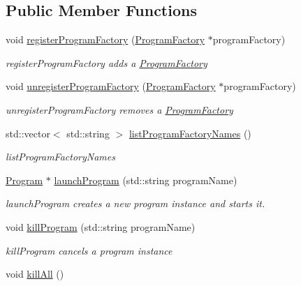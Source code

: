 \subsection*{Public Member Functions}
\begin{DoxyCompactItemize}
\item 
void \hyperlink{classdrobot_1_1program_1_1ProgramManager_a4ea28e6c3b74b746364bbc3c2d68bd31}{register\-Program\-Factory} (\hyperlink{classdrobot_1_1program_1_1ProgramFactory}{Program\-Factory} $\ast$program\-Factory)
\begin{DoxyCompactList}\small\item\em register\-Program\-Factory adds a \hyperlink{classdrobot_1_1program_1_1ProgramFactory}{Program\-Factory} \end{DoxyCompactList}\item 
void \hyperlink{classdrobot_1_1program_1_1ProgramManager_a190faf45e5e408b02e0b9858240244ea}{unregister\-Program\-Factory} (\hyperlink{classdrobot_1_1program_1_1ProgramFactory}{Program\-Factory} $\ast$program\-Factory)
\begin{DoxyCompactList}\small\item\em unregister\-Program\-Factory removes a \hyperlink{classdrobot_1_1program_1_1ProgramFactory}{Program\-Factory} \end{DoxyCompactList}\item 
std\-::vector$<$ std\-::string $>$ \hyperlink{classdrobot_1_1program_1_1ProgramManager_a8d67fbed1cdde2f1b0053809e2a35a7b}{list\-Program\-Factory\-Names} ()
\begin{DoxyCompactList}\small\item\em list\-Program\-Factory\-Names \end{DoxyCompactList}\item 
\hyperlink{classdrobot_1_1program_1_1Program}{Program} $\ast$ \hyperlink{classdrobot_1_1program_1_1ProgramManager_adf94bbb6de02d9d304e2776a9e21d40d}{launch\-Program} (std\-::string program\-Name)
\begin{DoxyCompactList}\small\item\em launch\-Program creates a new program instance and starts it. \end{DoxyCompactList}\item 
void \hyperlink{classdrobot_1_1program_1_1ProgramManager_a8ff0772daea03353f6473e041469093a}{kill\-Program} (std\-::string program\-Name)
\begin{DoxyCompactList}\small\item\em kill\-Program cancels a program instance \end{DoxyCompactList}\item 
\hypertarget{classdrobot_1_1program_1_1ProgramManager_a193a85cf0e58c44955513aab1e7253b4}{void \hyperlink{classdrobot_1_1program_1_1ProgramManager_a193a85cf0e58c44955513aab1e7253b4}{kill\-All} ()}\label{classdrobot_1_1program_1_1ProgramManager_a193a85cf0e58c44955513aab1e7253b4}


\end{DoxyCompactItemize}

